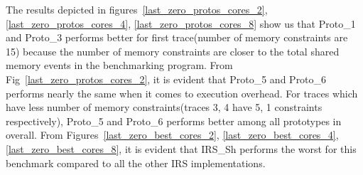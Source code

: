 The results depicted in figures~\ref{last_zero_protos_cores_2}, \ref{last_zero_protos_cores_4}, \ref{last_zero_protos_cores_8} show us that Proto\_1 and Proto\_3 performs better for first trace(number of memory constraints are 15) because the number of memory constraints are closer to the total shared memory events in the benchmarking program. 
From Fig~\ref{last_zero_protos_cores_2}, it is evident that Proto\_5 and Proto\_6 performs nearly the same when it comes to execution overhead. 
For traces which have less number of memory constraints(traces 3, 4 have 5, 1 constraints respectively), Proto\_5 and Proto\_6 performs better among all prototypes in overall. 
From Figures~\ref{last_zero_best_cores_2}, \ref{last_zero_best_cores_4}, \ref{last_zero_best_cores_8}, it is evident that IRS\_Sh performs the worst for this benchmark compared to all the other IRS implementations. 
